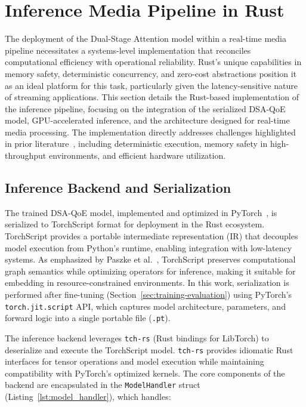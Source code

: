 \section{Inference Media Pipeline in Rust}
\label{sec:rust_pipeline}

The deployment of the Dual-Stage Attention model within a real-time media pipeline necessitates a systems-level implementation that reconciles computational efficiency with operational reliability. Rust’s unique capabilities in memory safety, deterministic concurrency, and zero-cost abstractions position it as an ideal platform for this task, particularly given the latency-sensitive nature of streaming applications. This section details the Rust-based implementation of the inference pipeline, focusing on the integration of the serialized DSA-QoE model, GPU-accelerated inference, and the architecture designed for real-time media processing. The implementation directly addresses challenges highlighted in prior literature~\cite{fulton2022benefits, johansson2023transitioning, sharma2023rust}, including deterministic execution, memory safety in high-throughput environments, and efficient hardware utilization.

\subsection{Inference Backend and Serialization}
\label{sec:rust_serialization}

The trained DSA-QoE model, implemented and optimized in PyTorch~\cite{paszke2019pytorch}, is serialized to TorchScript format for deployment in the Rust ecosystem. TorchScript provides a portable intermediate representation (IR) that decouples model execution from Python’s runtime, enabling integration with low-latency systems. As emphasized by Paszke et al.~\cite{paszke2019pytorch}, TorchScript preserves computational graph semantics while optimizing operators for inference, making it suitable for embedding in resource-constrained environments. In this work, serialization is performed after fine-tuning (Section~\ref{sec:training-evaluation}) using PyTorch’s \texttt{torch.jit.script} API, which captures model architecture, parameters, and forward logic into a single portable file (\texttt{.pt}).

The inference backend leverages \texttt{tch-rs} (Rust bindings for LibTorch) to deserialize and execute the TorchScript model. \texttt{tch-rs} provides idiomatic Rust interfaces for tensor operations and model execution while maintaining compatibility with PyTorch’s optimized kernels. The core components of the backend are encapsulated in the \texttt{ModelHandler} struct (Listing~\ref{lst:model_handler}), which handles:

